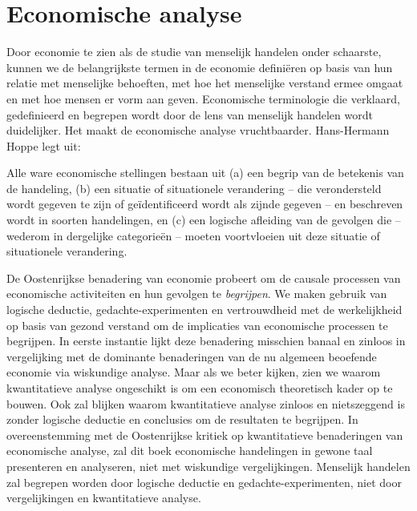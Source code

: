 \vspace{-1em}
\section{Economische analyse}

Door economie te zien als de studie van menselijk handelen onder schaarste, kunnen we de belangrijkste termen in de economie definiëren op basis van hun relatie met menselijke behoeften, met hoe het menselijke verstand ermee omgaat en met hoe mensen er vorm aan geven. Economische terminologie die verklaard, gedefinieerd en begrepen wordt door de lens van menselijk handelen wordt duidelijker. Het maakt de economische analyse vruchtbaarder. Hans-Hermann Hoppe legt uit:

\begin{blockquotebox}
Alle ware economische stellingen bestaan uit (a) een begrip van de betekenis van de handeling, (b) een situatie of situationele verandering – die verondersteld wordt gegeven te zijn of geïdentificeerd wordt als zijnde gegeven – en beschreven wordt in soorten handelingen, en (c) een logische afleiding van de gevolgen die – wederom in dergelijke categorieën – moeten voortvloeien uit deze situatie of situationele verandering.\footnotemark 
\end{blockquotebox}

De Oostenrijkse benadering van economie probeert om de causale processen van economische activiteiten en hun gevolgen te \textit{begrijpen}. We maken gebruik van logische deductie, gedachte-experimenten en vertrouwdheid met de werkelijkheid op basis van gezond verstand om de implicaties van economische processen te begrijpen. In eerste instantie lijkt deze benadering misschien banaal en zinloos in vergelijking met de dominante benaderingen van de nu algemeen beoefende economie via wiskundige analyse. Maar als we beter kijken, zien we waarom kwantitatieve analyse ongeschikt is om een economisch theoretisch kader op te bouwen. Ook zal blijken waarom kwantitatieve analyse zinloos en nietszeggend is zonder logische deductie en conclusies om de resultaten te begrijpen. In overeenstemming met de Oostenrijkse kritiek op kwantitatieve benaderingen van economische analyse, zal dit boek economische handelingen in gewone taal presenteren en analyseren, niet met wiskundige vergelijkingen. Menselijk handelen zal begrepen worden door logische deductie en gedachte-experimenten, niet door vergelijkingen en kwantitatieve analyse.

